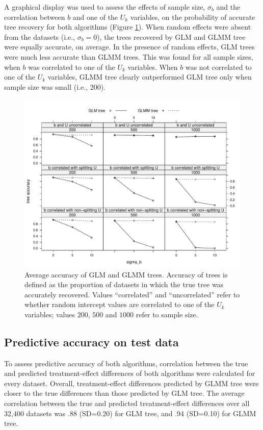 \documentclass[nobf,doc]{apa}
\begin{document}
A graphical display was used to assess the effects of sample size, $\sigma_b$ and the correlation between $b$ and one of the $U_k$ variables, on the probability of accurate tree recovery for both algorithms (Figure \ref{fig:xyplot_treeaccuracy}). When random effects were absent from the datasets (i.e., $\sigma_b = 0$), the trees recovered by GLM and GLMM tree were equally accurate, on average. In the presence of random effects, GLM trees were much less accurate than GLMM trees. This was found for all sample sizes, when $b$ was correlated to one of the $U_k$ variables. When $b$ was not correlated to one of the $U_k$ variables, GLMM tree clearly outperformed GLM tree only when sample size was small (i.e., 200).



\begin{figure}[!htbp]
	\includegraphics[width=12cm]{xy_accuracy.pdf}
	\caption{Average accuracy of GLM and GLMM trees. Accuracy of trees is defined as the proportion of datasets in which the true tree was accurately recovered. Values ``correlated'' and ``uncorrelated'' refer to whether random intercept values are correlated to one of the $U_k$ variables; values $200$, $500$ and $1000$ refer to sample size.}
	\label{fig:xyplot_treeaccuracy}
\end{figure}





\subsection{Predictive accuracy on test data}

To assess predictive accuracy of both algorithms, correlation between the true and predicted treatment-effect differences of both algorithms were calculated for every dataset. Overall, treatment-effect differences predicted by GLMM tree were closer to the true differences than those predicted by GLM tree. The average correlation between the true and predicted treatment-effect differences over all 32,400 datasets was .88 (SD=0.20) for GLM tree, and .94 (SD=0.10) for GLMM tree.
\end{document}
